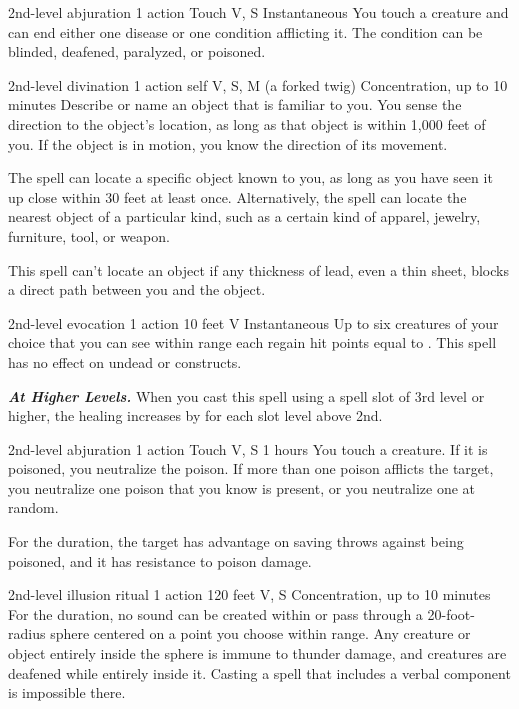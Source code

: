 \documentclass[10pt,twoside,twocolumn,openany]{book}
\newcommand{\castingModifier}{3}
\newcommand\impact[1]{
	\textbf{\textit{#1}}
}
\begin{document}
{2nd-level abjuration}
{\color{action}1 action}
{Touch}
{V, S}
{Instantaneous}
%
You touch a creature and can end either one disease or one condition afflicting it. The condition can be blinded, deafened, paralyzed, or poisoned.

{2nd-level divination}
{\color{action}1 action}
{self}
{V, S, M (a forked twig)}
{{\color{concentration}Concentration}, up to 10 minutes}
%
Describe or name an object that is familiar to you. You sense the direction to the object's location, as long as that object is within 1,000 feet of you. If the object is in motion, you know the direction of its movement.

The spell can locate a specific object known to you, as long as you have seen it up close within 30 feet at least once. Alternatively, the spell can locate the nearest object of a particular kind, such as a certain kind of apparel, jewelry, furniture, tool, or weapon.

This spell can't locate an object if any thickness of lead, even a thin sheet, blocks a direct path between you and the object.

{2nd-level evocation}
{\color{action}1 action}
{10 feet}
{V}
{Instantaneous}
%
Up to six creatures of your choice that you can see within range each regain hit points equal to \dice{2d8 + \castingModifier}. This spell has no effect on undead or constructs.

\impact{At Higher Levels.} When you cast this spell using a spell slot of 3rd level or higher, the healing increases by
 for each slot level above 2nd.

{2nd-level abjuration}
{\color{action}1 action}
{Touch}
{V, S}
{1 hours}
%
You touch a creature. If it is poisoned, you neutralize the poison. If more than one poison afflicts the target, you neutralize one poison that you know is present, or you neutralize one at random.

For the duration, the target has advantage on saving throws against being poisoned, and it has resistance to poison damage.

{2nd-level illusion {\color{ritual} ritual}}
{\color{action}1 action}
{120 feet}
{V, S}
{{\color{concentration}Concentration}, up to 10 minutes}
%
For the duration, no sound can be created within or pass through a 20-foot-radius sphere centered on a point you choose within range. Any creature or object entirely inside the sphere is immune to thunder damage, and creatures are deafened while entirely inside it. Casting a spell that includes a verbal component is impossible there.
\end{document}
